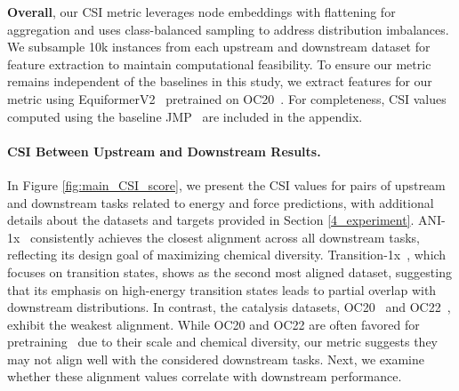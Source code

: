 \textbf{Overall}, our CSI metric leverages node embeddings with flattening for aggregation and uses class-balanced sampling to address distribution imbalances. We subsample 10k instances from each upstream and downstream dataset for feature extraction to maintain computational feasibility. To ensure our metric remains independent of the baselines in this study, we extract features for our metric using EquiformerV2~\cite{liaoequiformerv2} pretrained on OC20~\cite{chanussot2021open}. For completeness, CSI values computed using the baseline JMP~\cite{shoghimolecules} are included in the appendix.






\paragraph{CSI Between Upstream and Downstream Results.} In Figure \ref{fig:main_CSI_score}, we present the CSI values for pairs of upstream and downstream tasks related to energy and force predictions, with additional details about the datasets and targets provided in Section \ref{4_experiment}. ANI-1x~\cite{smith2020ani} consistently achieves the closest alignment across all downstream tasks, reflecting its design goal of maximizing chemical diversity. Transition-1x~\cite{schreiner2022transition1x}, which focuses on transition states, shows as the second most aligned dataset, suggesting that its emphasis on high-energy transition states leads to partial overlap with downstream distributions. In contrast, the catalysis datasets, OC20~\cite{chanussot2021open} and OC22~\cite{tran2023open}, exhibit the weakest alignment. While OC20 and OC22 are often favored for pretraining~\cite{shoghimolecules, kolluru2022transfer} due to their scale and chemical diversity, our metric suggests they may not align well with the considered downstream tasks. 
Next, we examine whether these alignment values correlate with downstream performance.
